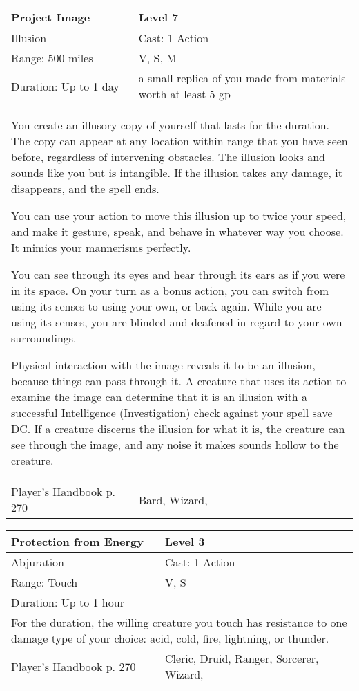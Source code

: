 \documentclass[11pt]{report}
\begin{document}
\begin{table}[H]
	\begin{tabular}{||p{6cm}|p{6cm}||}
		\hline\hline
		\bf{Project Image} & Level 7\\ \hline
		Illusion & Cast: 1 Action\\ \hline
		Range: 500 miles & V, S, M\\ \hline
		Duration: Up to 1 day & a small replica of you made from materials worth at least 5 gp\\ \hline
		\multicolumn{2}{||p{12cm}||}{You create an illusory copy of yourself that lasts for the duration.
The copy can appear at any location within range that you have seen before, regardless of intervening obstacles. The illusion looks and sounds like you but is intangible. If the illusion takes any damage, it disappears, and the spell ends.

You can use your action to move this illusion up to twice your speed, and make it gesture, speak, and behave in whatever way you choose. It mimics your mannerisms perfectly.

You can see through its eyes and hear through its ears as if you were in its space. On your turn as a bonus action, you can switch from using its senses to using your own, or back again. While you are using its senses, you are blinded and deafened in regard to your own surroundings.

Physical interaction with the image reveals it to be an illusion, because things can pass through it. A creature that uses its action to examine the image can determine that it is an illusion with a successful Intelligence (Investigation) check against your spell save DC. If a creature discerns the illusion for what it is, the creature can see through the image, and any noise it makes sounds hollow to the creature.}\\ \hline
Player's Handbook p. 270 & Bard, Wizard, \\ \hline\hline
	\end{tabular}
\end{table}

\begin{table}[H]
	\begin{tabular}{||p{6cm}|p{6cm}||}
		\hline\hline
		\bf{Protection from Energy} & Level 3\\ \hline
		Abjuration & Cast: 1 Action\\ \hline
		Range: Touch & V, S\\ \hline
		Duration: Up to 1 hour & \\ \hline
		\multicolumn{2}{||p{12cm}||}{For the duration, the willing creature you touch has resistance to one damage type of your choice: acid, cold, fire, lightning, or thunder.}\\ \hline
Player's Handbook p. 270 & Cleric, Druid, Ranger, Sorcerer, Wizard, \\ \hline\hline
	\end{tabular}
\end{table}
\end{document}
